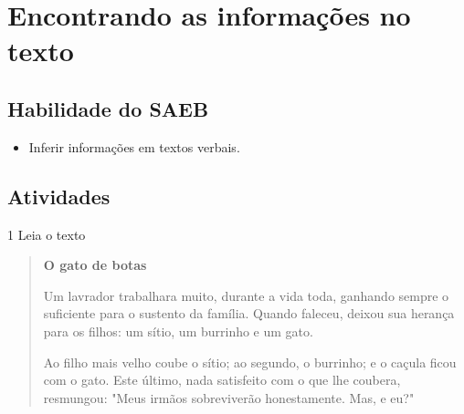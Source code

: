 \chapter[Encontrando as informações no texto]{\Large Encontrando as informações no texto}

\section*{Habilidade do SAEB}

\begin{itemize}
\item
Inferir informações em textos verbais.
\end{itemize}



\pagebreak
\section*{Atividades}

\num{1} Leia o texto

\begin{quote}
\textbf{O gato de botas}

Um lavrador trabalhara muito, durante a vida toda, ganhando sempre o
suficiente para o sustento da família. Quando faleceu, deixou sua
herança para os filhos: um sítio, um burrinho e um gato.

Ao filho mais velho coube o sítio; ao segundo, o
burrinho; e o caçula ficou com o gato.
Este último, nada satisfeito com o que lhe coubera,
resmungou: "Meus irmãos sobreviverão honestamente. Mas, e eu?"

\end{quote}

